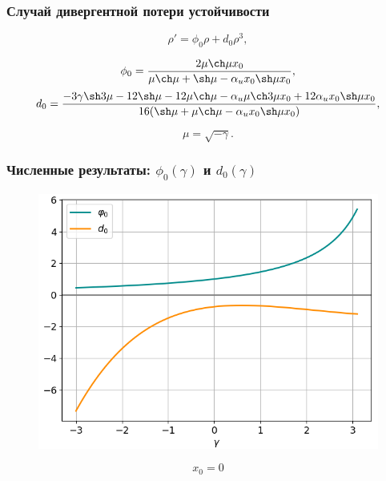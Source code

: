 \documentclass[fullscreen=true, unicode, bookmarks=false]{beamer}
\begin{document}
\begin{frame}
\frametitle{ Случай дивергентной потери устойчивости }

\begin{equation}
	\rho' = \phi_0 \rho + d_0 \rho^3,
\end{equation}

\bigskip

$$ \phi_0 = \frac{ 2 \mu \ch \mu x_0 }{ \mu \ch \mu +\sh \mu - \alpha_u x_0 \sh \mu x_0 }, $$
$$ d_0 = \frac{ -3\gamma \sh 3\mu - 12 \sh \mu - 12 \mu \ch \mu - \alpha_u \mu \ch 3\mu x_0 + 12 \alpha_u x_0 \sh \mu x_0 }{ 16( \sh \mu + \mu \ch \mu - \alpha_u x_0 \sh \mu x_0 ) }, $$

$$ \mu = \sqrt{-\gamma}. $$

\end{frame}

\begin{frame}
\frametitle{ Численные результаты: $ \phi_0(\gamma) $ и $ d_0(\gamma) $ }

\begin{figure} 
\includegraphics[scale=0.55]{divergent_phi0d0_0.png}  
\end{figure}

$$ x_0 = 0 $$

\end{frame}
\end{document}

